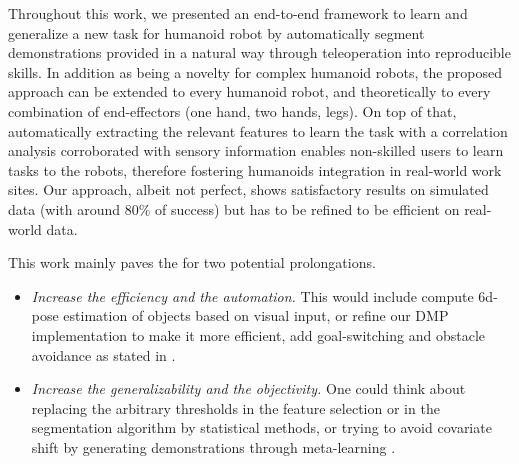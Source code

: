 \documentclass[conference]{IEEEtran}
\begin{document}
Throughout this work, we presented an end-to-end framework to learn and generalize a new task for humanoid robot by automatically segment demonstrations provided in a natural way through teleoperation into reproducible skills. In addition as being a novelty for complex humanoid robots, the proposed approach can be extended to every humanoid robot, and theoretically to every combination of end-effectors (one hand, two hands, legs). On top of that, automatically extracting the relevant features to learn the task with a correlation analysis corroborated with sensory information enables non-skilled users to learn tasks to the robots, therefore fostering humanoids integration in real-world work sites. Our approach, albeit not perfect, shows satisfactory results on simulated data (with around 80\% of success) but has to be refined to be efficient on real-world data. \newline


This work mainly paves the for two potential prolongations.
\begin{itemize}
    \item \textit{Increase the efficiency and the automation.} This would include compute 6d-pose estimation of objects based on visual input, or refine our DMP implementation to make it more efficient, add goal-switching and obstacle avoidance as stated in \cite{saveriano_dynamic_2021}. 
    
    \item  \textit{Increase the generalizability and the objectivity.} One could think about replacing the arbitrary thresholds in the feature selection or in the segmentation algorithm by statistical methods, or trying to avoid covariate shift by generating demonstrations through meta-learning \cite{yu_one-shot_2018}.

\end{itemize}




\vspace{12pt}
\end{document}
